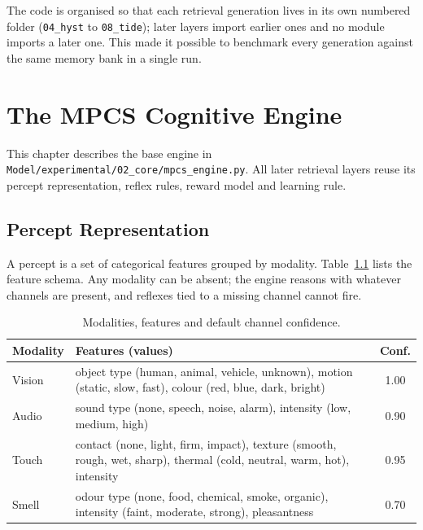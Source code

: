 \documentclass[12pt,a4paper,oneside]{report}
\newcommand{\code}[1]{\texttt{\small #1}}
\begin{document}
\noindent The code is organised so that each retrieval generation lives in its own numbered folder (\code{04\_hyst} to \code{08\_tide}); later layers import earlier ones and no module imports a later one. This made it possible to benchmark every generation against the same memory bank in a single run.

\chapter{The MPCS Cognitive Engine}\label{ch:core}
This chapter describes the base engine in \code{Model/experimental/02\_core/mpcs\_engine.py}. All later retrieval layers reuse its percept representation, reflex rules, reward model and learning rule.

\section{Percept Representation}
A percept is a set of categorical features grouped by modality. Table~\ref{tab:modalities} lists the feature schema. Any modality can be absent; the engine reasons with whatever channels are present, and reflexes tied to a missing channel cannot fire.

\begin{table}[H]
\centering
\caption{Modalities, features and default channel confidence.}
\label{tab:modalities}
\small
\begin{tabularx}{\linewidth}{@{}l X c@{}}
\toprule
Modality & Features (values) & Conf.\\
\midrule
Vision & object type (human, animal, vehicle, unknown), motion (static, slow, fast), colour (red, blue, dark, bright) & 1.00\\
Audio & sound type (none, speech, noise, alarm), intensity (low, medium, high) & 0.90\\
Touch & contact (none, light, firm, impact), texture (smooth, rough, wet, sharp), thermal (cold, neutral, warm, hot), intensity & 0.95\\
Smell & odour type (none, food, chemical, smoke, organic), intensity (faint, moderate, strong), pleasantness & 0.70\\
\bottomrule
\end{tabularx}
\end{table}
\end{document}
